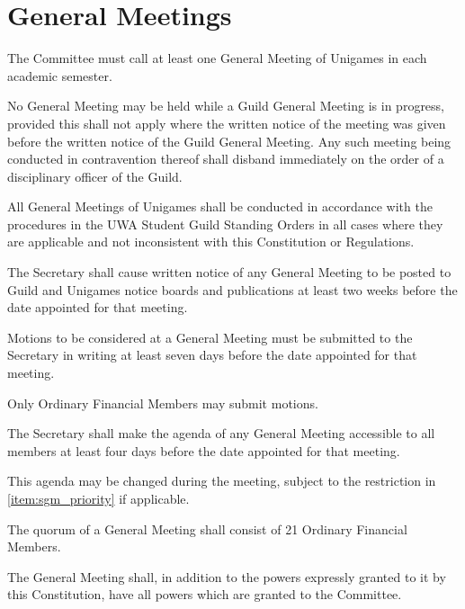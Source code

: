 \documentclass[a4paper]{article}
\begin{document}
\section{General Meetings} \label{sec:general_meetings}
\begin{myEnumerate}
    \item The Committee must call at least one General Meeting of Unigames in each academic semester.
    \item No General Meeting may be held while a Guild General Meeting is in progress, provided this shall not apply where the written notice of the meeting was given before the written notice of the Guild General Meeting. Any such meeting being conducted in contravention thereof shall disband immediately on the order of a disciplinary officer of the Guild.
    \item All General Meetings of Unigames shall be conducted in accordance with the procedures in the UWA Student Guild Standing Orders in all cases where they are applicable and not inconsistent with this Constitution or Regulations.
    \item The Secretary shall cause written notice of any General Meeting to be posted to Guild and Unigames notice boards and publications at least two weeks before the date appointed for that meeting.
    \item Motions to be considered at a General Meeting must be submitted to the Secretary in writing at least seven days before the date appointed for that meeting.
        \begin{myEnumerate}
            \item Only Ordinary Financial Members may submit motions.
        \end{myEnumerate}
    \item The Secretary shall make the agenda of any General Meeting accessible to all members at least four days before the date appointed for that meeting.
        \begin{myEnumerate}
            \item This agenda may be changed during the meeting, subject to the restriction in \cref{item:sgm_priority} if applicable.
        \end{myEnumerate}
    \item The quorum of a General Meeting shall consist of 21 Ordinary Financial Members.
    \item The General Meeting shall, in addition to the powers expressly granted to it by this Constitution, have all powers which are granted to the Committee.

\end{myEnumerate}
\end{document}
